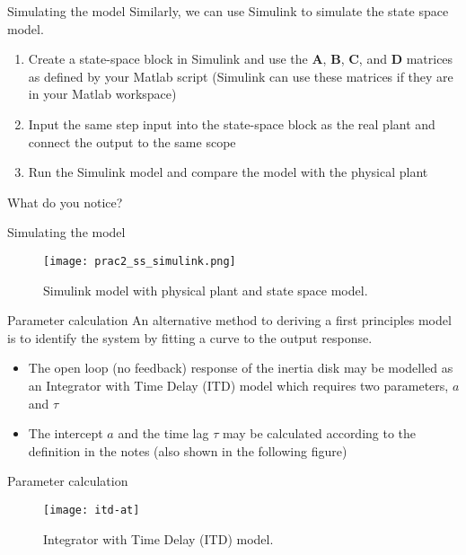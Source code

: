 \documentclass[9pt]{beamer-control}
\begin{document}
\begin{frame}{Simulating the model}
Similarly, we can use Simulink to simulate the state space model.
\begin{enumerate}
	\item Create a state-space block in Simulink and use the $\mathbf{A}$, $\mathbf{B}$, $\mathbf{C}$, and $\mathbf{D}$ matrices as defined by your Matlab script (Simulink can use these matrices if they are in your Matlab workspace)
	\item Input the same step input into the state-space block as the real plant and connect the output to the same scope
	\item Run the Simulink model and compare the model with the physical plant
\end{enumerate}

What do you notice?

\end{frame}


\begin{frame}{Simulating the model}
	 \begin{figure}
		\centering
		\texttt{[image: prac2\_ss\_simulink.png]}
		\caption{Simulink model with physical plant and state space model.}
	\end{figure}
\end{frame}



\begin{frame}{Parameter calculation}
An alternative method to deriving a first principles model is to identify the system by fitting a curve to the output response. 

\begin{itemize}
	\item The open loop (no feedback) response of the inertia disk may be modelled as an Integrator with Time Delay (ITD) model which requires two parameters, $a$ and $\tau$
	\item The intercept $a$ and the time lag $\tau$ may be calculated according to the definition in the notes (also shown in the following figure)
\end{itemize}


\end{frame}

\begin{frame}{Parameter calculation}
	\begin{figure}
		\centering
		\texttt{[image: itd-at]}
		\caption{Integrator with Time Delay (ITD) model.}
	\end{figure}
\end{frame}
\end{document}
